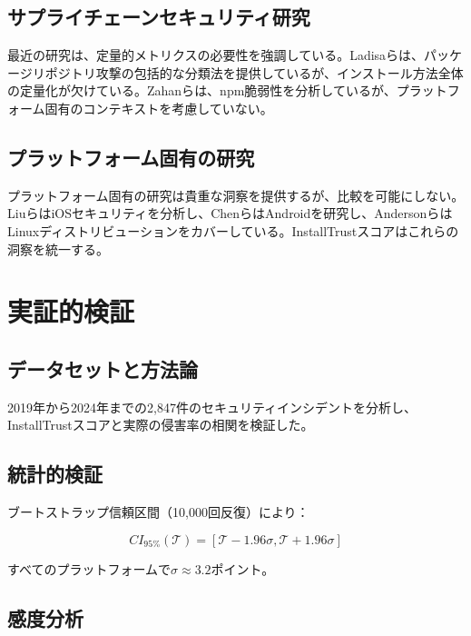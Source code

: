 \documentclass[Specialissue]{jsaiart}
\begin{document}
\subsection{サプライチェーンセキュリティ研究}

最近の研究は、定量的メトリクスの必要性を強調している。Ladisaら\cite{ladisa2023taxonomy}は、パッケージリポジトリ攻撃の包括的な分類法を提供しているが、インストール方法全体の定量化が欠けている。Zahanら\cite{zahan2024packages}は、npm脆弱性を分析しているが、プラットフォーム固有のコンテキストを考慮していない。

\subsection{プラットフォーム固有の研究}

プラットフォーム固有の研究は貴重な洞察を提供するが、比較を可能にしない。Liuら\cite{liu2024ios}はiOSセキュリティを分析し、Chenら\cite{chen2023android}はAndroidを研究し、Andersonら\cite{anderson2024linux}はLinuxディストリビューションをカバーしている。InstallTrustスコアはこれらの洞察を統一する。

\section{実証的検証}

\subsection{データセットと方法論}

2019年から2024年までの2,847件のセキュリティインシデントを分析し、InstallTrustスコアと実際の侵害率の相関を検証した。

\subsection{統計的検証}

ブートストラップ信頼区間（10,000回反復）により：

\begin{equation}
CI_{95\%}(\mathcal{T}) = [\mathcal{T} - 1.96\sigma, \mathcal{T} + 1.96\sigma]
\end{equation}

すべてのプラットフォームで$\sigma \approx 3.2$ポイント。

\subsection{感度分析}
\end{document}
